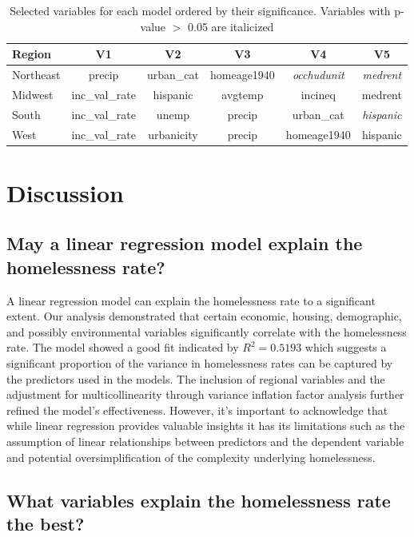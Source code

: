 \documentclass[12pt]{article}
\begin{document}
\begin{table}[ht]
\centering
\begin{tabular}{|l|c|c|c|c|c|}
\hline
\textbf{Region} & \textbf{V1} & \textbf{V2} & \textbf{V3} & \textbf{V4} & \textbf{V5} \\
\hline
Northeast & precip & urban\_cat & homeage1940 & \textit{occhudunit} & \textit{medrent} \\
\hline
Midwest & inc\_val\_rate & hispanic & avgtemp & incineq & medrent \\
\hline
South & inc\_val\_rate & unemp & precip & urban\_cat & \textit{hispanic} \\
\hline
West & inc\_val\_rate & urbanicity & precip & homeage1940 & hispanic \\
\hline
\end{tabular}
\caption{Selected variables for each model ordered by their significance. Variables with p-value $>$ 0.05 are italicized}
\label{table:variables_by_pvalue}
\end{table}

\section{Discussion}
\subsection{May a linear regression model explain the homelessness rate?}
A linear regression model can explain the homelessness rate to a significant extent. Our analysis demonstrated that certain economic, housing, demographic, and possibly environmental variables significantly correlate with the homelessness rate. The model showed a good fit indicated by $R^2 = 0.5193$ which suggests a significant proportion of the variance in homelessness rates can be captured by the predictors used in the models. The inclusion of regional variables and the adjustment for multicollinearity through variance inflation factor analysis further refined the model's effectiveness. However, it's important to acknowledge that while linear regression provides valuable insights it has its limitations such as the assumption of linear relationships between predictors and the dependent variable and potential oversimplification of the complexity underlying homelessness.

\subsection{What variables explain the homelessness rate the best?}
\end{document}
